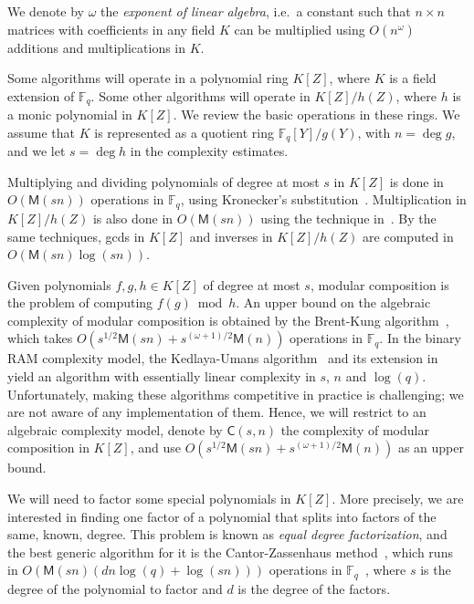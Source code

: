 \documentclass[12pt]{article}
\theoremstyle{plain}
\theoremstyle{definition}
\def\F{\ensuremath{\mathbb{F}}}
\def\MM{\ensuremath{\mathsf{M}}}
\def\CC{\ensuremath{\mathsf{C}}}
\newcounter{algorithm}
\begin{document}
We denote by $\omega$ the \emph{exponent of linear algebra}, i.e.\ a
constant such that $n\times n$ matrices with coefficients in any field
$K$ can be multiplied using $O(n^\omega)$ additions and
multiplications in $K$.

Some algorithms will operate in a polynomial ring $K[Z]$, where $K$ is
a field extension of $\F_q$. Some other algorithms will operate in
$K[Z]/h(Z)$, where $h$ is a monic polynomial in $K[Z]$. We review the
basic operations in these rings. We assume that $K$ is represented as
a quotient ring $\F_q[Y]/g(Y)$, with $n=\deg g$, and we let $s=\deg h$
in the complexity estimates.

Multiplying and dividing polynomials of degree at most $s$ in $K[Z]$
is done in $O(\MM(sn))$ operations in $\F_q$, using Kronecker's
substitution~\cite{moenck76,kaltofen87,vzGG,vzgathen+shoup92,harvey09}.
Multiplication in $K[Z]/h(Z)$ is also done in $O(\MM(sn))$ using the
technique in~\cite{pascal+schost06}. By the same techniques, gcds in
$K[Z]$ and inverses in $K[Z]/h(Z)$ are computed in $O(\MM(sn)\log(sn))$.

Given polynomials $f,g,h\in K[Z]$ of degree at most $s$, modular
composition is the problem of computing $f(g) \bmod h$. An upper bound
on the algebraic complexity of modular composition is obtained by the
Brent-Kung algorithm~\cite{brent+kung}, which takes $O(s^{1/2}\MM(sn)
+ s^{(\omega+1)/2}\MM(n))$ operations in $\F_q$.  In the binary RAM
complexity model, the Kedlaya-Umans algorithm~\cite{KeUm11} and its
extension in~\cite{PoSc13a} yield an algorithm with essentially linear
complexity in $s$, $n$ and $\log(q)$. Unfortunately, making these
algorithms competitive in practice is challenging; we are not aware of
any implementation of them. Hence, we will restrict to an algebraic
complexity model, denote by $\CC(s,n)$ the complexity of modular
composition in $K[Z]$, and use $O(s^{1/2}\MM(sn) +
s^{(\omega+1)/2}\MM(n))$ as an upper bound.

We will need to factor some special polynomials in $K[Z]$. More
precisely, we are interested in finding one factor of a polynomial
that splits into factors of the same, known, degree. This problem is
known as \emph{equal degree factorization}, and the best generic
algorithm for it is the Cantor-Zassenhaus
method~\cite{cantor1981,von1992computing}, which runs in
$O(\MM(sn)(dn\log(q) + \log(sn)))$ operations in
$\F_q$~\cite[Th.~14.9]{vzGG}, where $s$ is the degree of the
polynomial to factor and $d$ is the degree of the factors.
\end{document}
